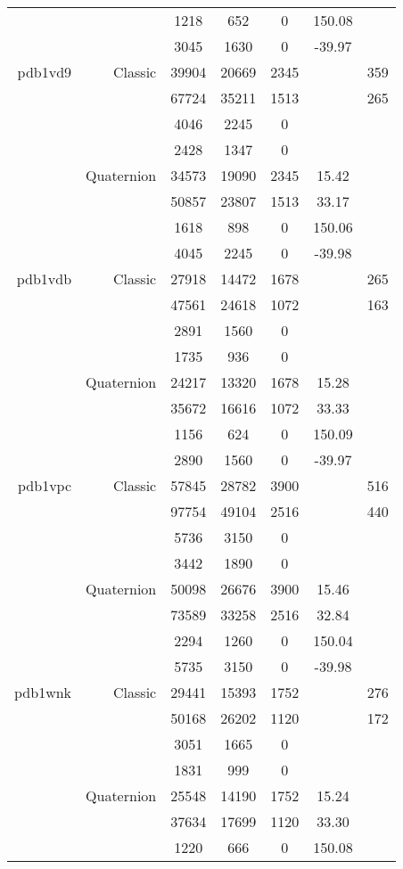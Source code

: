 \begin{xltabular}{\textwidth}{r|rcccSc}
& & 1218 & 652 & 0 & 150.08 & \\
& & 3045 & 1630 & 0 & -39.97 & \\ \addlinespace
pdb1vd9 & Classic & 39904 & 20669 & 2345 & & 359 \\
& & 67724 & 35211 & 1513 & & 265 \\
& & 4046 & 2245 & 0 & & \\
& & 2428 & 1347 & 0 & & \\
& Quaternion & 34573 & 19090 & 2345 & 15.42 & \\
& & 50857 & 23807 & 1513 & 33.17 & \\
& & 1618 & 898 & 0 & 150.06 & \\
& & 4045 & 2245 & 0 & -39.98 & \\ \addlinespace
pdb1vdb & Classic & 27918 & 14472 & 1678 & & 265 \\
& & 47561 & 24618 & 1072 & & 163 \\
& & 2891 & 1560 & 0 & & \\
& & 1735 & 936 & 0 & & \\
& Quaternion & 24217 & 13320 & 1678 & 15.28 & \\
& & 35672 & 16616 & 1072 & 33.33 & \\
& & 1156 & 624 & 0 & 150.09 & \\
& & 2890 & 1560 & 0 & -39.97 & \\ \addlinespace
pdb1vpc & Classic & 57845 & 28782 & 3900 & & 516 \\
& & 97754 & 49104 & 2516 & & 440 \\
& & 5736 & 3150 & 0 & & \\
& & 3442 & 1890 & 0 & & \\
& Quaternion & 50098 & 26676 & 3900 & 15.46 & \\
& & 73589 & 33258 & 2516 & 32.84 & \\
& & 2294 & 1260 & 0 & 150.04 & \\
& & 5735 & 3150 & 0 & -39.98 & \\ \addlinespace
pdb1wnk & Classic & 29441 & 15393 & 1752 & & 276 \\
& & 50168 & 26202 & 1120 & & 172 \\
& & 3051 & 1665 & 0 & & \\
& & 1831 & 999 & 0 & & \\
& Quaternion & 25548 & 14190 & 1752 & 15.24 & \\
& & 37634 & 17699 & 1120 & 33.30 & \\
& & 1220 & 666 & 0 & 150.08 & \\

\end{xltabular}

